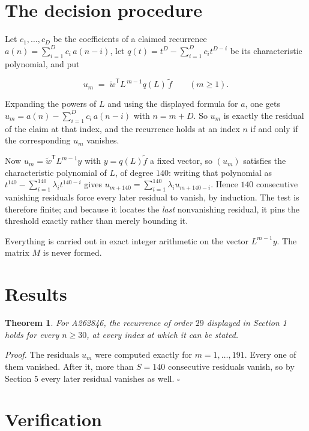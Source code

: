 \documentclass[11pt]{article}
\newtheorem{theorem}{Theorem}
\theoremstyle{definition}
\begin{document}
\section{The decision procedure}

Let $c_1,\dots,c_D$ be the coefficients of a claimed recurrence $a(n) = \sum_{i=1}^{D} c_i\,a(n-i)$, let $q(t) = t^{D} - \sum_{i=1}^{D} c_i t^{D-i}$ be its characteristic polynomial, and put

\[u_m \;=\; \tilde w^{\mathsf T} L^{\,m-1} q(L)\,\tilde f \qquad (m \ge 1).\]

Expanding the powers of $L$ and using the displayed formula for $a$, one gets $u_m = a(n) - \sum_{i=1}^{D} c_i\,a(n-i)$ with $n = m + D$. So $u_m$ is exactly the residual of the claim at that index, and the recurrence holds at an index $n$ if and only if the corresponding $u_m$ vanishes.

Now $u_m = \tilde w^{\mathsf T} L^{m-1} y$ with $y = q(L)\tilde f$ a fixed vector, so $(u_m)$ satisfies the characteristic polynomial of $L$, of degree $140$: writing that polynomial as $t^{140} - \sum_{i=1}^{140} \lambda_i t^{140-i}$ gives $u_{m+140} = \sum_{i=1}^{140} \lambda_i u_{m+140-i}$. Hence $140$ consecutive vanishing residuals force every later residual to vanish, by induction. The test is therefore finite; and because it locates the {\itshape last} nonvanishing residual, it pins the threshold exactly rather than merely bounding it.

Everything is carried out in exact integer arithmetic on the vector $L^{m-1}y$. The matrix $M$ is never formed.

\section{Results}

\begin{theorem} For A262846, the recurrence of order $29$ displayed in Section 1 holds for every $n \ge 30$, at every index at which it can be stated.\end{theorem}

{\itshape Proof.} The residuals $u_m$ were computed exactly for $m = 1,\dots,191$. Every one of them vanished. After it, more than $S = 140$ consecutive residuals vanish, so by Section 5 every later residual vanishes as well. $\square$

\section{Verification}
\end{document}
